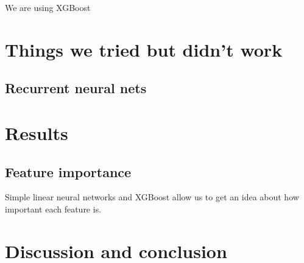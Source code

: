\documentclass[a4paper,10pt]{scrartcl}
\begin{document}
We are using XGBoost


\section{Things we tried but didn't work}

\subsection{Recurrent neural nets}


\section{Results}
\label{sec:results}


\subsection{Feature importance}
Simple linear neural networks and XGBoost allow us to get an idea about how important each feature is.


\section{Discussion and conclusion}



\end{document}

